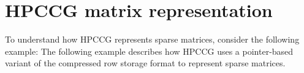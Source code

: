 



\section{HPCCG matrix representation}
\label{sec:hpccg-matrix-representation}

To understand how HPCCG represents sparse matrices, consider the following example:
The following example describes how HPCCG uses a pointer-based variant of the compressed row storage format to represent sparse matrices.




